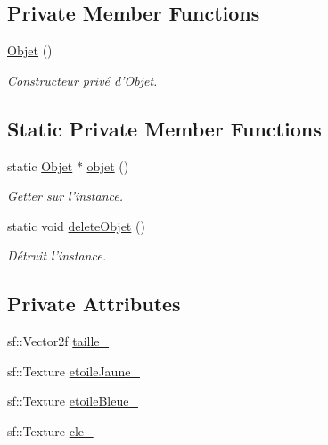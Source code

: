 \subsection*{Private Member Functions}
\begin{DoxyCompactItemize}
\item 
\hypertarget{classPropriete_1_1Objet_aefdd826d50085897e4894ffef4597d04}{\hyperlink{classPropriete_1_1Objet_aefdd826d50085897e4894ffef4597d04}{Objet} ()}\label{classPropriete_1_1Objet_aefdd826d50085897e4894ffef4597d04}

\begin{DoxyCompactList}\small\item\em Constructeur privé d'\hyperlink{classPropriete_1_1Objet}{Objet}. \end{DoxyCompactList}\end{DoxyCompactItemize}
\subsection*{Static Private Member Functions}
\begin{DoxyCompactItemize}
\item 
\hypertarget{classPropriete_1_1Objet_a8eb2770e11cc3ae56351b148a8271fc0}{static \hyperlink{classPropriete_1_1Objet}{Objet} $\ast$ \hyperlink{classPropriete_1_1Objet_a8eb2770e11cc3ae56351b148a8271fc0}{objet} ()}\label{classPropriete_1_1Objet_a8eb2770e11cc3ae56351b148a8271fc0}

\begin{DoxyCompactList}\small\item\em Getter sur l'instance. \end{DoxyCompactList}\item 
\hypertarget{classPropriete_1_1Objet_ac12ff7e75ac3f992d53d22e1b9a8b3ef}{static void \hyperlink{classPropriete_1_1Objet_ac12ff7e75ac3f992d53d22e1b9a8b3ef}{delete\-Objet} ()}\label{classPropriete_1_1Objet_ac12ff7e75ac3f992d53d22e1b9a8b3ef}

\begin{DoxyCompactList}\small\item\em Détruit l'instance. \end{DoxyCompactList}\end{DoxyCompactItemize}
\subsection*{Private Attributes}
\begin{DoxyCompactItemize}
\item 
sf\-::\-Vector2f \hyperlink{classPropriete_1_1Objet_a0f283d62e8e997ef2941646771481f16}{taille\-\_\-}
\item 
sf\-::\-Texture \hyperlink{classPropriete_1_1Objet_a7d4658bf0769bba02c88f14357cf5f9d}{etoile\-Jaune\-\_\-}
\item 
sf\-::\-Texture \hyperlink{classPropriete_1_1Objet_a769b3717d9f8caf4c81bd10229e9d000}{etoile\-Bleue\-\_\-}
\item 
sf\-::\-Texture \hyperlink{classPropriete_1_1Objet_a9ce6e8537fa7a4687885d32e284f7ddf}{cle\-\_\-}
\end{DoxyCompactItemize}
